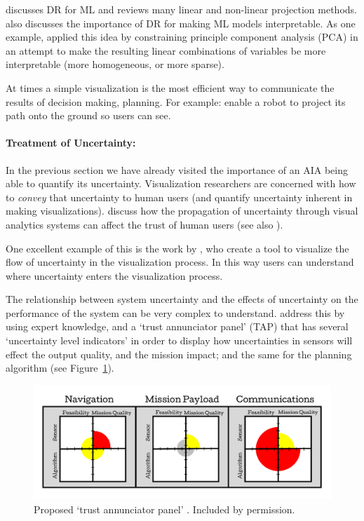 \citet{Venna2007-yj} discusses DR for ML and reviews many linear and non-linear projection methods. \citet{Vellido2012-nm} also discusses the importance of DR for making ML models interpretable. As one example, \citet{Chipman2005-om} applied this idea by constraining principle component analysis (PCA) in an attempt to make the resulting linear combinations of variables be more interpretable (more homogeneous, or more sparse).

At times a simple visualization is the most efficient way to communicate the results of decision making, planning. For example: \citet{Chadalavada2015-wx} enable a robot to project its path onto the ground so users can see.

\paragraph{Treatment of Uncertainty:}
In the previous section we have already visited the importance of an AIA being able to quantify its uncertainty. Visualization researchers are concerned with how to \emph{convey} that uncertainty to human users (and quantify uncertainty inherent in making visualizations). \cite{Sacha2016-tu} discuss how the propagation of uncertainty through visual analytics systems can affect the trust of human users (see also \cite{Correa2009-hi}).

One excellent example of this is the work by \citet{Wu2012-qi}, who create a tool to visualize the flow of uncertainty in the visualization process. In this way users can understand where uncertainty enters the visualization process.

The relationship between system uncertainty and the effects of uncertainty on the performance of the system can be very complex to understand. \citet{Hutchins2015-if} address this by using expert knowledge, and a `trust annunciator panel' (TAP) that has several `uncertainty level indicators' in order to display how uncertainties in sensors will effect the output quality, and the mission impact; and the same for the planning algorithm (see Figure~\ref{fig:hutchins_fig}).

\begin{figure}[htpb]
    \centering
    \includegraphics[width=0.9\linewidth]{Figures/Hutchins_fig.pdf}
    \caption{Proposed `trust annunciator panel' \cite{Hutchins2015-if}. Included by permission.}
    \label{fig:hutchins_fig}
\end{figure}

